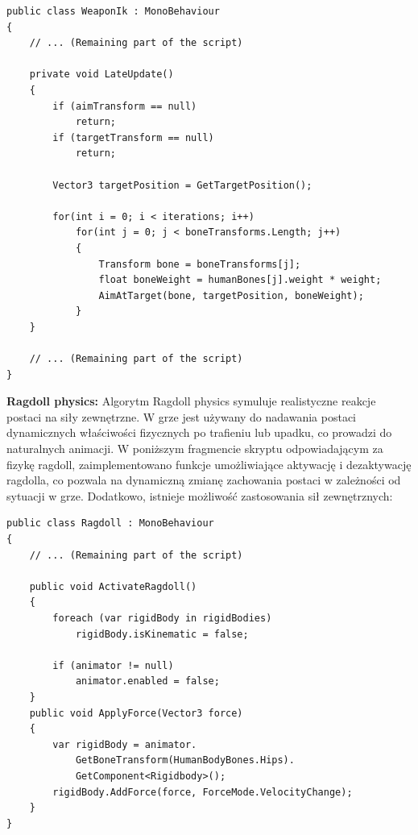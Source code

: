 \begin{codebox}
\begin{lstlisting}[language={[Sharp]C}, label={listing:WeaponIk.cs}]
public class WeaponIk : MonoBehaviour
{
    // ... (Remaining part of the script)

    private void LateUpdate()
    {
        if (aimTransform == null)
            return;
        if (targetTransform == null)
            return;

        Vector3 targetPosition = GetTargetPosition();

        for(int i = 0; i < iterations; i++)
            for(int j = 0; j < boneTransforms.Length; j++)
            {
                Transform bone = boneTransforms[j];
                float boneWeight = humanBones[j].weight * weight;
                AimAtTarget(bone, targetPosition, boneWeight);
            }
    }

    // ... (Remaining part of the script)
}
\end{lstlisting}
\end{codebox}
\newpage
\textbf{Ragdoll physics:} Algorytm Ragdoll physics symuluje realistyczne reakcje postaci na siły zewnętrzne. W grze jest używany do nadawania postaci dynamicznych właściwości fizycznych po trafieniu lub upadku, co prowadzi do naturalnych animacji. W poniższym fragmencie skryptu odpowiadającym za fizykę ragdoll, zaimplementowano funkcje umożliwiające aktywację i dezaktywację ragdolla, co pozwala na dynamiczną zmianę zachowania postaci w zależności od sytuacji w grze. Dodatkowo, istnieje możliwość zastosowania sił zewnętrznych:
\begin{codebox}
\begin{lstlisting}[language={[Sharp]C}, label={listing:Ragdoll.cs}]
public class Ragdoll : MonoBehaviour
{
    // ... (Remaining part of the script)

    public void ActivateRagdoll()
    {
        foreach (var rigidBody in rigidBodies)
            rigidBody.isKinematic = false;

        if (animator != null)
            animator.enabled = false;
    }
    public void ApplyForce(Vector3 force)
    {
        var rigidBody = animator.
            GetBoneTransform(HumanBodyBones.Hips).
            GetComponent<Rigidbody>();
        rigidBody.AddForce(force, ForceMode.VelocityChange);
    }
}
\end{lstlisting}
\end{codebox}
\newpage

